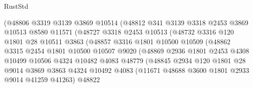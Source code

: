 \begin{lexlean}{RustStd}
\begin{coremodule}
                          (@48806
                            @3319
                            @3139
                            @3869
                            @10514
                            (@48812
                              @341
                              @3139
                              @3318
                              @2453
                              @3869
                              @10513
                              @8580
                              @11571
                              (@48727
                                @3318
                                @2453
                                @10513
                                (@48732
                                  @3316
                                  @120
                                  @1801
                                  @28
                                  @10511
                                  @3863
                                  (@48857
                                    @3316
                                    @1801
                                    @10500
                                    @10509
                                    (@48862
                                      @3315
                                      @2454
                                      @1801
                                      @10500
                                      @10507
                                      @9020
                                      (@48869
                                        @2936
                                        @1801
                                        @2453
                                        @4308
                                        @10499
                                        @10506
                                        @4324
                                        @10482
                                        @4083
                                        @48779
                                        (@48845
                                          @2934
                                          @120
                                          @1801
                                          @28
                                          @9014
                                          @3869
                                          @3863
                                          @4324
                                          @10492
                                          @4083
                                          (@11671 @48688 @3600 @1801 @2933 @9014 @41259 @41263)
                                          @48822

\end{coremodule}
\end{lexlean}
